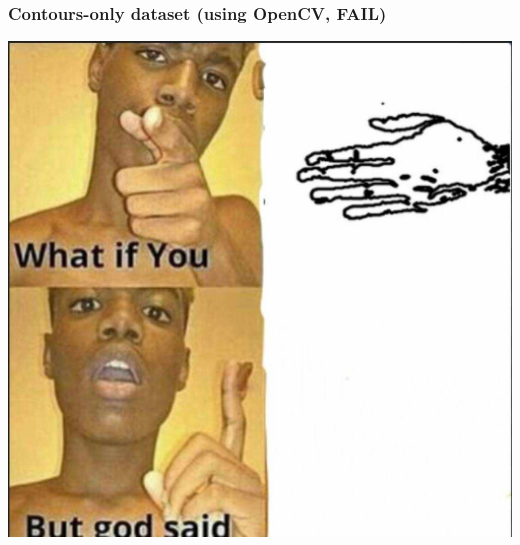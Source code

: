 \documentclass[aspectratio=169]{beamer}
\begin{document}
\begin{frame}
  \frametitle{Contours-only dataset (using OpenCV, FAIL)}
\centering
\includegraphics[height=0.87\textheight]{images/meme.png}
\end{frame}
\end{document}
